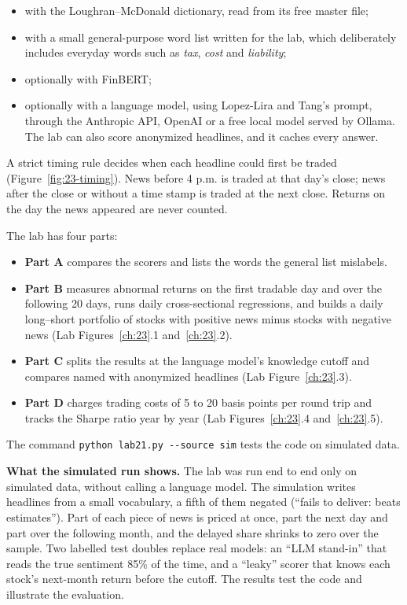 \begin{itemize}
  \item with the Loughran--McDonald dictionary, read from its free master file;
  \item with a small general-purpose word list written for the lab, which deliberately includes everyday words such as \emph{tax}, \emph{cost} and \emph{liability};
  \item optionally with FinBERT;
  \item optionally with a language model, using Lopez-Lira and Tang's prompt, through the Anthropic API, OpenAI or a free local model served by Ollama. The lab can also score anonymized headlines, and it caches every answer.
\end{itemize}

A strict timing rule decides when each headline could first be traded (Figure~\ref{fig:23-timing}). News before 4 p.m. is traded at that day's close; news after the close or without a time stamp is traded at the next close. Returns on the day the news appeared are never counted.

The lab has four parts:

\begin{itemize}
  \item \textbf{Part A} compares the scorers and lists the words the general list mislabels.
  \item \textbf{Part B} measures abnormal returns on the first tradable day and over the following 20 days, runs daily cross-sectional regressions, and builds a daily long--short portfolio of stocks with positive news minus stocks with negative news (Lab Figures~\ref{ch:23}.1 and~\ref{ch:23}.2).
  \item \textbf{Part C} splits the results at the language model's knowledge cutoff and compares named with anonymized headlines (Lab Figure~\ref{ch:23}.3).
  \item \textbf{Part D} charges trading costs of 5 to 20 basis points per round trip and tracks the Sharpe ratio year by year (Lab Figures~\ref{ch:23}.4 and~\ref{ch:23}.5).
\end{itemize}

The command \texttt{python lab21.py -{}-source sim} tests the code on simulated data.

\textbf{What the simulated run shows.} The lab was run end to end only on simulated data, without calling a language model. The simulation writes headlines from a small vocabulary, a fifth of them negated (``fails to deliver: beats estimates''). Part of each piece of news is priced at once, part the next day and part over the following month, and the delayed share shrinks to zero over the sample. Two labelled test doubles replace real models: an ``LLM stand-in'' that reads the true sentiment 85\% of the time, and a ``leaky'' scorer that knows each stock's next-month return before the cutoff. The results test the code and illustrate the evaluation.

